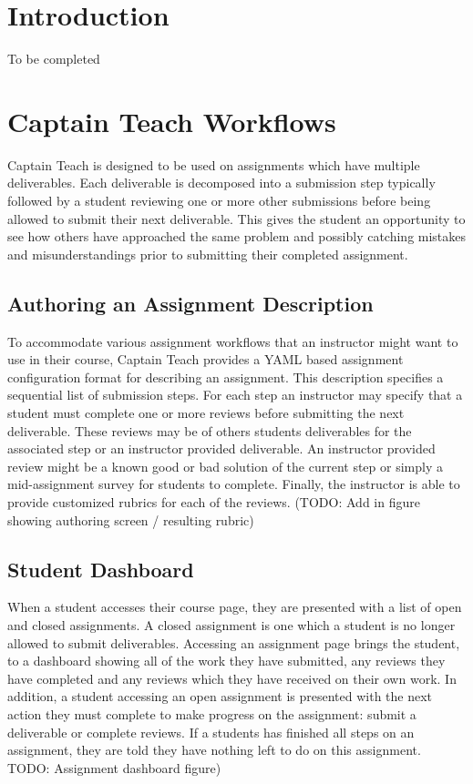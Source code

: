 \documentclass{sig-alternate}
\begin{document}


\section{Introduction}
To be completed


\section{Captain Teach Workflows}
Captain Teach is designed to be used on assignments which have multiple
deliverables. Each deliverable is decomposed into a submission step typically
followed by a student reviewing one or more other submissions before being
allowed to submit their next deliverable. This gives the student an
opportunity to see how others have approached the same problem and possibly
catching mistakes and misunderstandings prior to submitting their completed
assignment.

\subsection{Authoring an Assignment Description}
To accommodate various assignment workflows that an instructor might want to use
in their course, Captain Teach provides a YAML based assignment configuration 
format for describing an assignment. This description specifies a sequential 
list of submission steps. For each step an instructor may specify that a 
student must complete one or more reviews before submitting the next deliverable.
These reviews may be of others students deliverables for the associated step or 
an instructor provided deliverable. An instructor provided review might be a
known good or bad solution of the current step or simply a mid-assignment 
survey for students to complete. Finally, the instructor is able to provide
customized rubrics for each of the reviews. (TODO: Add in figure showing authoring screen / resulting rubric)


\subsection{Student Dashboard}
When a student accesses their course page, they are presented with a list of
open and closed assignments. A closed assignment is one which a student
is no longer allowed to submit deliverables.
Accessing an assignment page brings the student,
to a dashboard showing all of the work they have submitted, any reviews
they have completed and any reviews which they have received on their own work.
In addition, a student accessing an open assignment is presented with the next
action they must complete to make progress on the assignment: submit a 
deliverable or complete reviews. If a students has finished all steps on an
assignment, they are told they have nothing left to do on this assignment. 
TODO: Assignment dashboard figure)
\end{document}
